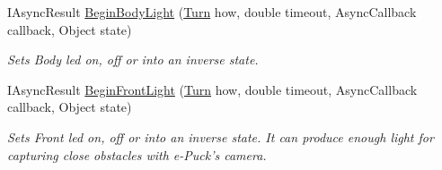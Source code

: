 \begin{DoxyCompactItemize}
  \item   IAsyncResult \hyperlink{class_elib_1_1_epuck_a42ebf85e7f8c6e507ef83d5bd0818650}{BeginBodyLight} (\hyperlink{namespace_elib_a3bd21aa0f35c1f8d086ea6ac1e09a87c}{Turn} how, double timeout, AsyncCallback callback, Object state)
  \begin{DoxyCompactList}\small\item\em Sets Body led on, off or into an inverse state. \item\end{DoxyCompactList}

  \item   IAsyncResult \hyperlink{class_elib_1_1_epuck_a07dff54022189967aab3a17480813803}{BeginFrontLight} (\hyperlink{namespace_elib_a3bd21aa0f35c1f8d086ea6ac1e09a87c}{Turn} how, double timeout, AsyncCallback callback, Object state)
  \begin{DoxyCompactList}\small\item\em Sets Front led on, off or into an inverse state. It can produce enough light for capturing close obstacles with e-\/Puck's camera. \item\end{DoxyCompactList}

  \end{DoxyCompactItemize}

